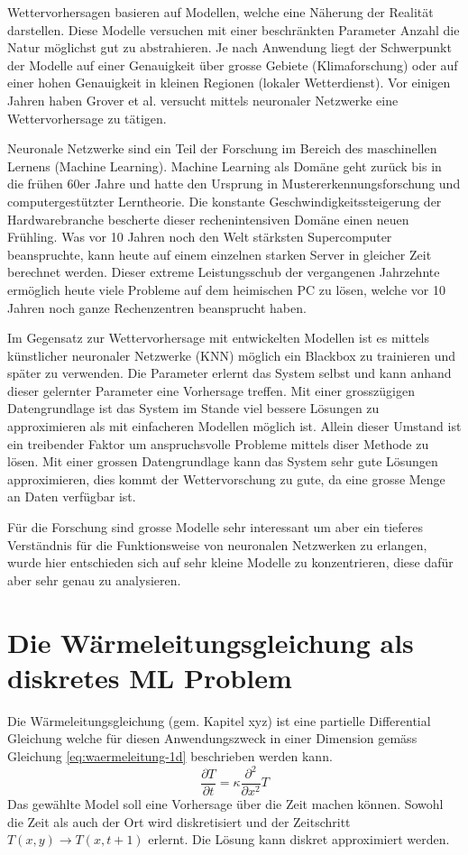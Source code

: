 Wettervorhersagen basieren auf Modellen, welche eine Näherung der Realität darstellen. Diese Modelle versuchen mit einer beschränkten Parameter Anzahl die Natur möglichst gut zu abstrahieren. Je nach Anwendung liegt der Schwerpunkt der Modelle auf einer Genauigkeit über grosse Gebiete (Klimaforschung) oder auf einer hohen Genauigkeit in kleinen Regionen (lokaler Wetterdienst). Vor einigen Jahren haben Grover et al. \cite{Groover:2015} versucht mittels neuronaler Netzwerke eine Wettervorhersage zu tätigen.

Neuronale Netzwerke sind ein Teil der Forschung im Bereich des maschinellen Lernens (Machine Learning). Machine Learning als Domäne geht zurück bis in die frühen 60er Jahre und hatte den Ursprung in Mustererkennungsforschung und computergestützter Lerntheorie. Die konstante Geschwindigkeitssteigerung der Hardwarebranche bescherte dieser rechenintensiven Domäne einen neuen Frühling. Was vor 10 Jahren noch den Welt stärksten Supercomputer beanspruchte, kann heute auf einem einzelnen starken Server in gleicher Zeit berechnet werden. Dieser extreme Leistungsschub der vergangenen Jahrzehnte ermöglich heute viele Probleme auf dem heimischen PC zu lösen, welche vor 10 Jahren noch ganze Rechenzentren beansprucht haben.

Im Gegensatz zur Wettervorhersage mit entwickelten Modellen ist es mittels künstlicher neuronaler Netzwerke (KNN) möglich ein Blackbox zu trainieren und später zu verwenden. Die Parameter erlernt das System selbst und kann anhand dieser gelernter Parameter eine Vorhersage treffen. Mit einer grosszügigen Datengrundlage ist das System im Stande viel bessere Lösungen zu approximieren als mit einfacheren Modellen möglich ist. Allein dieser Umstand ist ein treibender Faktor um anspruchsvolle Probleme mittels diser Methode zu lösen. Mit einer grossen Datengrundlage kann das System sehr gute Lösungen approximieren, dies kommt der Wettervorschung zu gute, da eine grosse Menge an Daten verfügbar ist.

Für die Forschung sind grosse Modelle sehr interessant um aber ein tieferes Verständnis für die Funktionsweise von neuronalen Netzwerken zu erlangen, wurde hier entschieden sich auf sehr kleine Modelle zu konzentrieren, diese dafür aber sehr genau zu analysieren.

\section{Die Wärmeleitungsgleichung als diskretes ML Problem}
Die Wärmeleitungsgleichung (gem. Kapitel xyz) ist eine partielle Differential Gleichung welche für diesen Anwendungszweck in einer Dimension gemäss Gleichung \ref{eq:waermeleitung-1d} beschrieben werden kann.
\begin{equation}
\frac{\partial T}{\partial t} = \kappa \frac{\partial^2}{\partial x^2} T
\label{eq:waermeleitung-1d}
\end{equation}
Das gewählte Model soll eine Vorhersage über die Zeit machen können. Sowohl die Zeit als auch der Ort wird diskretisiert und der Zeitschritt $T(x,y) \rightarrow T(x,t+1)$ erlernt. Die Lösung kann diskret approximiert werden. 

